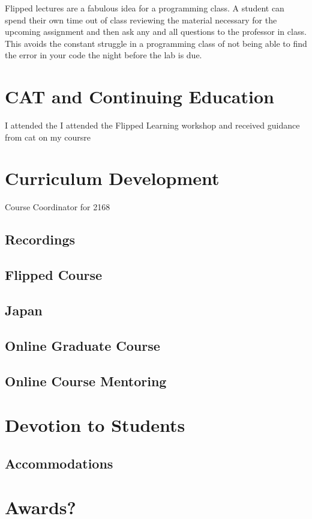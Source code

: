 \documentclass[]{article}
\begin{document}
Flipped lectures are a fabulous idea for a programming class. A student can spend their own time out of class reviewing the material necessary for the upcoming assignment and then ask any and all questions to the professor in class. This avoids the constant struggle in a programming class of not being able to find the error in your code the night before the lab is due.


\section{CAT and Continuing Education}


I attended the
I attended the Flipped Learning workshop and received guidance from cat on my coursre
\section{Curriculum Development}
Course Coordinator for 2168


\subsection{Recordings}

\subsection{Flipped Course}

\subsection{Japan}

\subsection{Online Graduate Course}

\subsection{Online Course Mentoring}

\section{Devotion to Students}


\subsection{Accommodations}


\section{Awards?}
\end{document}
